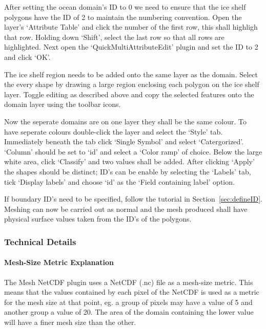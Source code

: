 After setting the ocean domain's ID to 0 we need to ensure that the ice shelf polygons have the ID of 2 to maintain the numbering convention. Open the layer's `Attribute Table' and click the number of the first row, this shall highligh that row. Holding down `Shift', select the last row so that all rows are highlighted. Next open the `QuickMultiAttributeEdit' plugin and set the ID to 2 and click `OK'. 

The ice shelf region needs to be added onto the same layer as the domain. Select the every shape by drawing a large region enclosing each polygon on the ice shelf layer. Toggle editing as described above and copy the selected features onto the domain layer using the toolbar icons. 

Now the seperate domains are on one layer they shall be the same colour. To have seperate colours double-click the layer and select the `Style' tab.
Immediately beneath the tab click `Single Symbol' and select `Catergorized'. `Column' should be set to `id' and select a `Color ramp' of choice. Below the large white area, click `Classify' and two values shall be added. After clicking `Apply' the shapes should be distinct; ID's can be enable by selecting the `Labels' tab, tick `Display labels' and choose `id' as the `Field containing label' option. 

If boundary ID's need to be specified, follow the tutorial in Section~\ref{sec:defineID}. Meshing can now be carried out as normal and the mesh produced shall have physical surface values taken from the ID's of the polygons.


\subsubsection{Technical Details}

\paragraph{Mesh-Size Metric Explanation \\}
\label{sec:msmExplanation}
The Mesh NetCDF plugin uses a NetCDF (.nc) file as a mesh-size metric. This means that the values contained by each pixel of the NetCDF is used as a metric for the mesh size at that point, eg. a group of pixels may have a value of 5 and another group a value of 20. The area of the domain containing the lower value will have a finer mesh size than the other.

